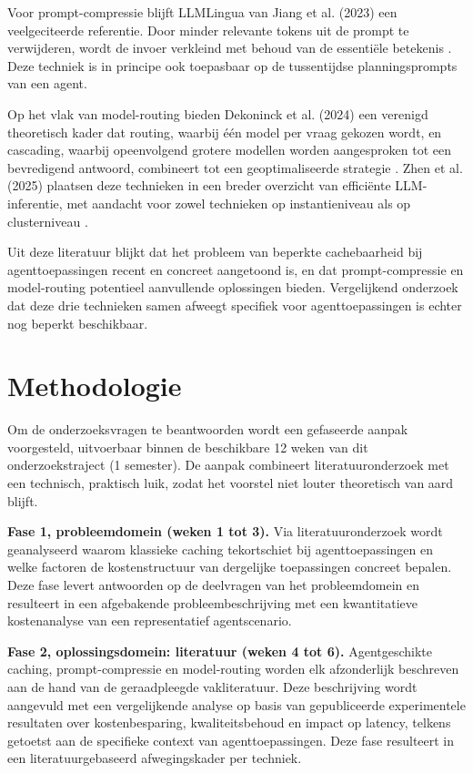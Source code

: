 \documentclass{hogent-article}
\begin{document}
Voor prompt-compressie blijft LLMLingua van Jiang et al. (2023) een veelgeciteerde referentie. Door minder relevante tokens uit de prompt te verwijderen, wordt de invoer verkleind met behoud van de essentiële betekenis \autocite{Jiang2023}. Deze techniek is in principe ook toepasbaar op de tussentijdse planningsprompts van een agent.

Op het vlak van model-routing bieden Dekoninck et al. (2024) een verenigd theoretisch kader dat routing, waarbij één model per vraag gekozen wordt, en cascading, waarbij opeenvolgend grotere modellen worden aangesproken tot een bevredigend antwoord, combineert tot een geoptimaliseerde strategie \autocite{Dekoninck2024}. Zhen et al. (2025) plaatsen deze technieken in een breder overzicht van efficiënte LLM-inferentie, met aandacht voor zowel technieken op instantieniveau als op clusterniveau \autocite{Zhen2025}.

Uit deze literatuur blijkt dat het probleem van beperkte cachebaarheid bij agenttoepassingen recent en concreet aangetoond is, en dat prompt-compressie en model-routing potentieel aanvullende oplossingen bieden. Vergelijkend onderzoek dat deze drie technieken samen afweegt specifiek voor agenttoepassingen is echter nog beperkt beschikbaar.

\section{Methodologie}%
\label{sec:methodologie}

Om de onderzoeksvragen te beantwoorden wordt een gefaseerde aanpak voorgesteld, uitvoerbaar binnen de beschikbare 12 weken van dit onderzoekstraject (1 semester). De aanpak combineert literatuuronderzoek met een technisch, praktisch luik, zodat het voorstel niet louter theoretisch van aard blijft.

\textbf{Fase 1, probleemdomein (weken 1 tot 3).} Via literatuuronderzoek wordt geanalyseerd waarom klassieke caching tekortschiet bij agenttoepassingen en welke factoren de kostenstructuur van dergelijke toepassingen concreet bepalen. Deze fase levert antwoorden op de deelvragen van het probleemdomein en resulteert in een afgebakende probleembeschrijving met een kwantitatieve kostenanalyse van een representatief agentscenario.

\textbf{Fase 2, oplossingsdomein: literatuur (weken 4 tot 6).} Agentgeschikte caching, prompt-compressie en model-routing worden elk afzonderlijk beschreven aan de hand van de geraadpleegde vakliteratuur. Deze beschrijving wordt aangevuld met een vergelijkende analyse op basis van gepubliceerde experimentele resultaten over kostenbesparing, kwaliteitsbehoud en impact op latency, telkens getoetst aan de specifieke context van agenttoepassingen. Deze fase resulteert in een literatuurgebaseerd afwegingskader per techniek.
\end{document}
